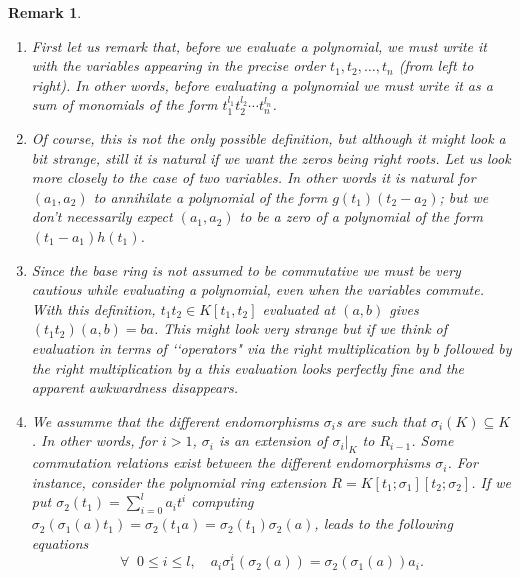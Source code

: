 \documentclass{amsproc}
\newcommand{\si}{\sigma}
\newtheorem{remark}[theorem]{Remark}
\numberwithin{equation}{section}
\begin{document}
\begin{remark}
	{\rm 
		\begin{enumerate}
			\item First let us remark that, before we evaluate a polynomial, we must write it with the variables appearing in the precise order $t_1,t_2,\dots,t_n$ (from left to right).  In other words, before evaluating a polynomial we must write it as a sum of monomials of the form $t_1^{l_1}t_2^{l_2}\cdots t_n^{l_n}$.  
			\item Of course, this is not the only possible definition, but although
			it might look a bit strange, still it is natural if we want the
			zeros being right roots.  Let us look more closely to the case of two variables.  In other words it is natural for $(a_1,a_2)$
			to annihilate a polynomial of the form $g(t_1)(t_2-a_2)$;  but we
			don't necessarily expect $(a_1,a_2)$ to be a zero of a polynomial of
			the form $(t_1-a_1)h(t_1)$.
			
			\item Since the base ring is not assumed to be commutative we must be very cautious while evaluating a polynomial, even when the variables commute.   
			With this definition, $t_1t_2\in K[t_1,t_2]$ evaluated
			at $(a,b)$ gives $(t_1t_2)(a,b)= ba$.  This might look very
			strange but if we think of evaluation in terms of \lq\lq operators" via
			the right multiplication by $b$ followed by the right
			multiplication by $a$ this evaluation looks perfectly fine and
			the apparent awkwardness disappears.  
			\item We assumme that the different endomorphisms $\si_i$s are such that $\si_i(K)\subseteq K$.  In other words, for $i>1$,
			$\si_i$ is an extension of $\si_i \vert _K$ to $R_{i-1}$.  Some commutation relations exist between the different endomorphisms $\si_i$.
			For instance, consider the polynomial ring extension
			$R=K[t_1;\si_1][t_2;\si_2]$.  If we put $\si_2(t_1)=\sum_{i=0}^{l}a_it^i$ computing $\si_2(\si_1(a)t_1)=\si_2(t_1a)=\si_2(t_1)\si_2(a)$, leads to the following equations
			$$
			\forall \;\; 0\le i \le l, \quad a_i\si_1^i(\si_2(a))=\si_2(\si_1(a))a_i.
			$$ 
		\end{enumerate}	
	}
\end{remark}
\vspace{3mm}
\end{document}
